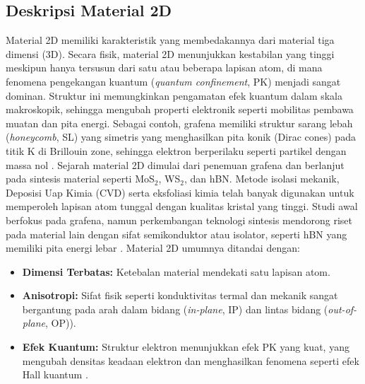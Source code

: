 \subsection{Deskripsi Material 2D}
Material 2D memiliki karakteristik yang membedakannya dari material tiga dimensi (3D).
Secara fisik, material 2D menunjukkan kestabilan yang tinggi meskipun hanya tersusun dari satu atau beberapa lapisan atom, di mana fenomena pengekangan kuantum (\textit{quantum confinement}, PK) menjadi sangat dominan.
Struktur ini memungkinkan pengamatan efek kuantum dalam skala makroskopik, sehingga mengubah properti elektronik seperti mobilitas pembawa muatan dan pita energi.
Sebagai contoh, grafena memiliki struktur sarang lebah (\textit{honeycomb}, SL) yang simetris yang menghasilkan pita konik (Dirac cones) pada titik K di Brillouin zone, sehingga elektron berperilaku seperti partikel dengan massa nol \cite{CastroNeto2009}.
Sejarah material 2D dimulai dari penemuan grafena dan berlanjut pada sintesis material seperti MoS\(_2\), WS\(_2\), dan hBN.
Metode isolasi mekanik, Deposisi Uap Kimia (CVD) serta eksfoliasi kimia telah banyak digunakan untuk memperoleh lapisan atom tunggal dengan kualitas kristal yang tinggi.
Studi awal berfokus pada grafena, namun perkembangan teknologi sintesis mendorong riset pada material lain dengan sifat semikonduktor atau isolator, seperti hBN yang memiliki pita energi lebar \cite{Geim2013}.
Material 2D umumnya ditandai dengan:
\begin{itemize}
    \item \textbf{Dimensi Terbatas:} Ketebalan material mendekati satu lapisan atom.
    \item \textbf{Anisotropi:} Sifat fisik seperti konduktivitas termal dan mekanik sangat bergantung pada arah dalam bidang (\emph{in-plane}, IP) dan lintas bidang (\emph{out-of-plane}, OP)).
    \item \textbf{Efek Kuantum:} Struktur elektron menunjukkan efek PK yang kuat, yang mengubah densitas keadaan elektron dan menghasilkan fenomena seperti efek Hall kuantum \cite{Das2015}.
\end{itemize}

